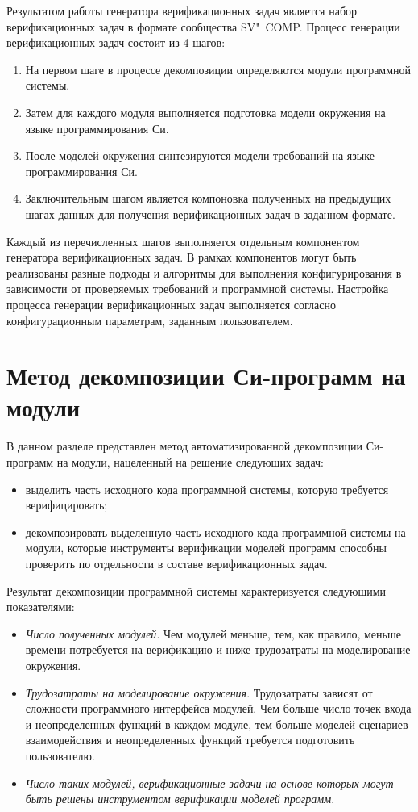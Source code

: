 Результатом работы генератора верификационных задач является набор верификационных задач в формате сообщества SV"~COMP.
Процесс генерации верификационных задач состоит из 4 шагов:
\begin{enumerate}
    \item На первом шаге в процессе декомпозиции определяются модули программной системы. 
    \item Затем для каждого модуля выполняется подготовка модели окружения на языке программирования Си.
    \item После моделей окружения синтезируются модели требований на языке программирования Си.
    \item Заключительным шагом является компоновка полученных на предыдущих шагах данных для получения верификационных задач в заданном формате.
\end{enumerate}

Каждый из перечисленных шагов выполняется отдельным компонентом генератора верификационных задач.
В рамках компонентов могут быть реализованы разные подходы и алгоритмы для выполнения конфигурирования в зависимости от проверяемых требований и программной системы.
Настройка процесса генерации верификационных задач выполняется согласно конфигурационным параметрам, заданным пользователем.

\section{Метод декомпозиции Си-программ на модули}
В данном разделе представлен метод автоматизированной декомпозиции Си-программ на модули, нацеленный на решение следующих задач:
\begin{itemize}
    \item выделить часть исходного кода программной системы, которую требуется верифицировать;
    \item декомпозировать выделенную часть исходного кода программной системы на модули, которые инструменты верификации моделей программ способны проверить по отдельности в составе верификационных задач.
\end{itemize}

Результат декомпозиции программной системы характеризуется следующими показателями:
\begin{itemize}
    \item \textit{Число полученных модулей}. Чем модулей меньше, тем, как правило, меньше времени потребуется на верификацию и ниже трудозатраты на моделирование окружения.
    \item \textit{Трудозатраты на моделирование окружения}. Трудозатраты зависят от сложности программного интерфейса модулей. Чем больше число точек входа и неопределенных функций в каждом модуле, тем больше моделей сценариев взаимодействия и неопределенных функций требуется подготовить пользователю.
    \item \textit{Число таких модулей, верификационные задачи на основе которых могут быть решены инструментом верификации моделей программ}.
\end{itemize}

